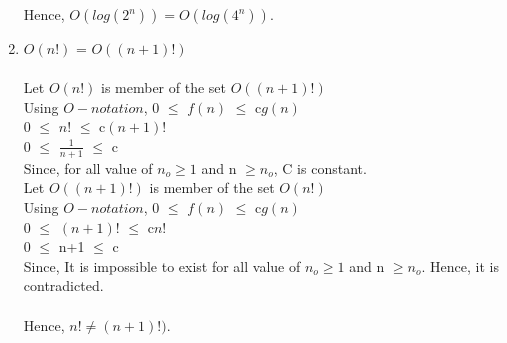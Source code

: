 \documentclass{article}
\begin{document}
\begin{enumerate}
    
    Hence, $O(log{}(2^n)) = O(log{}(4^n))$. \\  
    \item $O(n!)$  =  $O((n+1)!)$ \\\\
    Let $O(n!)$ is member of the set  $O((n+1)!)$ \\
    Using $O-notation$, 0 $\leq$  $f(n)$ $\leq$ c$g(n)$ \\
    0 $\leq$  $n!$ $\leq$ c$(n+1)!$ \\
    0 $\leq$ $\frac{1}{n+1}$ $\leq$ c \\
    Since, for all value  of $n_o \geq  1$ and n $\geq n_o$, C is constant.\\

    Let $O((n+1)!)$ is member of the set  $O(n!)$ \\
    Using $O-notation$, 0 $\leq$  $f(n)$ $\leq$ c$g(n)$ \\
    0 $\leq$ $(n+1)!$  $\leq$ c$n!$ \\
    0 $\leq$ n+1 $\leq$ c \\
    Since, It is impossible to exist for all value  of $n_o \geq  1$ and n $\geq n_o$. Hence, it is contradicted.\\\\
    Hence, $n! \neq (n+1)!)$.   \\
\end{enumerate}
\end{document}
